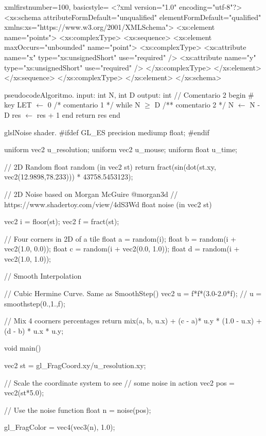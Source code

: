\begin{sourcecodep}{xml}{firstnumber=100, basicstyle={\fontsize{7}{10}\selectfont\ttfamily}}{}
<?xml version="1.0" encoding="utf-8"?>
<xs:schema attributeFormDefault="unqualified" elementFormDefault="qualified"
   xmlns:xs="https://www.w3.org/2001/XMLSchema">
  <xs:element name="points">
    <xs:complexType>
      <xs:sequence>
        <xs:element maxOccurs="unbounded" name="point">
          <xs:complexType>
            <xs:attribute name="x" type="xs:unsignedShort" use="required" />
            <xs:attribute name="y" type="xs:unsignedShort" use="required" />
          </xs:complexType>
        </xs:element>
      </xs:sequence>
    </xs:complexType>
  </xs:element>
</xs:schema>
\end{sourcecodep}

\begin{sourcecode}{pseudocode}{Algoritmo.}
input: int N, int D %
output: int // Comentario 2
begin # key
	LET $\gets$ 0 /* comentario 1 */
	while N $\geq$ D /** comentario 2 */
		N $\gets$ N - D
		res $\gets$ res + 1      
	end
	return res
end    
\end{sourcecode}

\begin{sourcecode}{glsl}{Noise shader.}
#ifdef GL_ES
precision mediump float;
#endif

uniform vec2 u_resolution;
uniform vec2 u_mouse;
uniform float u_time;

// 2D Random
float random (in vec2 st) {
	return fract(sin(dot(st.xy,
	vec2(12.9898,78.233)))
	* 43758.5453123);
}

// 2D Noise based on Morgan McGuire @morgan3d
// https://www.shadertoy.com/view/4dS3Wd
float noise (in vec2 st) {
	vec2 i = floor(st);
	vec2 f = fract(st);
	
	// Four corners in 2D of a tile
	float a = random(i);
	float b = random(i + vec2(1.0, 0.0));
	float c = random(i + vec2(0.0, 1.0));
	float d = random(i + vec2(1.0, 1.0));
	
	// Smooth Interpolation
	
	// Cubic Hermine Curve.  Same as SmoothStep()
	vec2 u = f*f*(3.0-2.0*f);
	// u = smoothstep(0.,1.,f);
	
	// Mix 4 coorners percentages
	return mix(a, b, u.x) +
	(c - a)* u.y * (1.0 - u.x) +
	(d - b) * u.x * u.y;
}

void main() {
	vec2 st = gl_FragCoord.xy/u_resolution.xy;
	
	// Scale the coordinate system to see
	// some noise in action
	vec2 pos = vec2(st*5.0);
	
	// Use the noise function
	float n = noise(pos);
	
	gl_FragColor = vec4(vec3(n), 1.0);
}
\end{sourcecode}

